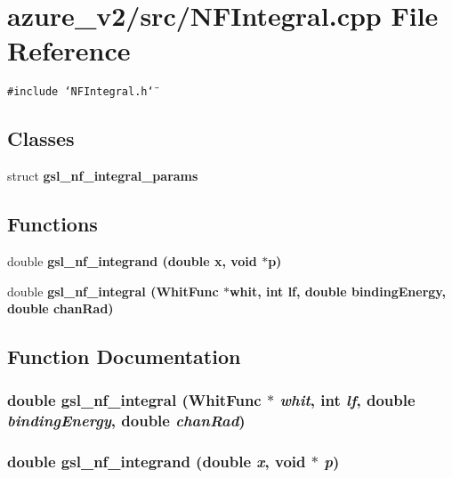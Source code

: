 \section{azure\_\-v2/src/NFIntegral.cpp File Reference}
\label{NFIntegral_8cpp}
{\tt \#include \char`\"{}NFIntegral.h\char`\"{}}\par
\subsection*{Classes}
\begin{CompactItemize}
\item 
struct \bf{gsl\_\-nf\_\-integral\_\-params}
\end{CompactItemize}
\subsection*{Functions}
\begin{CompactItemize}
\item 
double \bf{gsl\_\-nf\_\-integrand} (double x, void $\ast$p)
\item 
double \bf{gsl\_\-nf\_\-integral} (\bf{Whit\-Func} $\ast$whit, int lf, double binding\-Energy, double chan\-Rad)
\end{CompactItemize}


\subsection{Function Documentation}
\subsubsection{\setlength{\rightskip}{0pt plus 5cm}double gsl\_\-nf\_\-integral (\bf{Whit\-Func} $\ast$ {\em whit}, int {\em lf}, double {\em binding\-Energy}, double {\em chan\-Rad})}\label{NFIntegral_8cpp_af594920fffa074aa4eb34063701671c}


\subsubsection{\setlength{\rightskip}{0pt plus 5cm}double gsl\_\-nf\_\-integrand (double {\em x}, void $\ast$ {\em p})}\label{NFIntegral_8cpp_fa72b067f2527171b82beff85d26bfa7}


